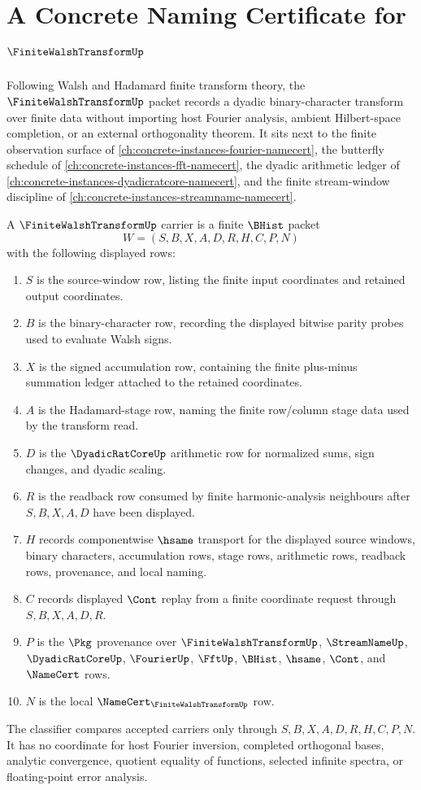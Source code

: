 \chapter{A Concrete Naming Certificate for $\FiniteWalshTransformUp$}
\label{ch:concrete-instances-finite-walsh-transform-namecert}

Following Walsh and Hadamard finite transform theory, the $\FiniteWalshTransformUp$ packet records a dyadic binary-character transform over finite data without importing host Fourier analysis, ambient Hilbert-space completion, or an external orthogonality theorem. It sits next to the finite observation surface of \autoref{ch:concrete-instances-fourier-namecert}, the butterfly schedule of \autoref{ch:concrete-instances-fft-namecert}, the dyadic arithmetic ledger of \autoref{ch:concrete-instances-dyadicratcore-namecert}, and the finite stream-window discipline of \autoref{ch:concrete-instances-streamname-namecert}.

\begin{definition}
\label{def:finite-walsh-transform-carrier}
A $\FiniteWalshTransformUp$ carrier is a finite $\BHist$ packet
$$
W=(S,B,X,A,D,R,H,C,P,N)
$$
with the following displayed rows:
\begin{enumerate}
\item $S$ is the source-window row, listing the finite input coordinates and retained output coordinates.
\item $B$ is the binary-character row, recording the displayed bitwise parity probes used to evaluate Walsh signs.
\item $X$ is the signed accumulation row, containing the finite plus-minus summation ledger attached to the retained coordinates.
\item $A$ is the Hadamard-stage row, naming the finite row/column stage data used by the transform read.
\item $D$ is the $\DyadicRatCoreUp$ arithmetic row for normalized sums, sign changes, and dyadic scaling.
\item $R$ is the readback row consumed by finite harmonic-analysis neighbours after $S,B,X,A,D$ have been displayed.
\item $H$ records componentwise $\hsame$ transport for the displayed source windows, binary characters, accumulation rows, stage rows, arithmetic rows, readback rows, provenance, and local naming.
\item $C$ records displayed $\Cont$ replay from a finite coordinate request through $S,B,X,A,D,R$.
\item $P$ is the $\Pkg$ provenance over $\FiniteWalshTransformUp$, $\StreamNameUp$, $\DyadicRatCoreUp$, $\FourierUp$, $\FftUp$, $\BHist$, $\hsame$, $\Cont$, and $\NameCert$ rows.
\item $N$ is the local $\NameCert_{\FiniteWalshTransformUp}$ row.
\end{enumerate}
The classifier compares accepted carriers only through $S,B,X,A,D,R,H,C,P,N$. It has no coordinate for host Fourier inversion, completed orthogonal bases, analytic convergence, quotient equality of functions, selected infinite spectra, or floating-point error analysis.
\end{definition}

